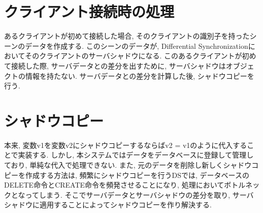 \section{クライアント接続時の処理}
あるクライアントが初めて接続した場合, そのクライアントの識別子を持ったシーンのデータを作成する. このシーンのデータが, Differential Synchronizationにおいてそのクライアントのサーバシャドウになる. このあるクライアントが初めて接続した際, サーバデータとの差分を出すために, サーバシャドウはオブジェクトの情報を持たない. サーバデータとの差分を計算した後, シャドウコピーを行う.
\section{シャドウコピー}
本来, 変数v1を変数v2にシャドウコピーするならばv2 = v1のように代入することで実装する. しかし, 本システムではデータをデータベースに登録して管理しており, 単純な代入で処理できない.
また, 元のデータを削除し新しくシャドウコピーを作成する方法は, 頻繁にシャドウコピーを行うDSでは,
データベースのDELETE命令とCREATE命令を頻発させることになり, 処理においてボトルネックとなってしまう. そこでサーバデータとサーバシャドウの差分を取り, サーバシャドウに適用することによってシャドウコピーを作り解決する.
